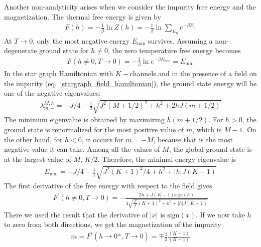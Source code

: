 \documentclass[reprint,prb,superscriptaddress]{revtex4-2}
\begin{document}
Another non-analyticity arises when we consider the impurity free energy and the magnetization. The thermal free energy is given by
\begin{equation}\begin{aligned}
	F(h) = -\frac{1}{\beta}\ln Z(h) = -\frac{1}{\beta}\ln\sum_{E_n}e^{-\beta E_n}
\end{aligned}\end{equation}
At \(T \to 0\), only the most negative energy \(E_\text{min}\) survives. Assuming a non-degenerate ground state for \(h \neq 0\), the zero temperature free energy becomes
\begin{equation}\begin{aligned}
	F(h\neq 0, T\to 0) = -\frac{1}{\beta}\ln e^{-\beta E_\text{min}} = E_\text{min}
\end{aligned}\end{equation}
In the star graph Hamiltonian with \(K-\)channels and in the presence of a field on the impurity (eq.~\ref{stargraph_field_hamiltonian}), the ground state energy will be one of the negative eigenvalues:
\begin{equation}\begin{aligned}
	\lambda^{M,h}_{m, -} = -J/4 - \frac{1}{2}\sqrt{J^2(M+1/2)^2 + h^2 + 2hJ(m+1/2)}
\end{aligned}\end{equation}
The minimum eigenvalue is obtained by maximizing \(h(m+1/2)\). For \(h>0\), the ground state is renormalized for the most positive value of \(m\), which is \(M-1\). On the other hand, for \(h<0\), it occurs for \(m=-M\), because that is the most negative value it can take. Among all the values of \(M\), the global ground state is at the largest value of \(M\), \(K/2\). Therefore, the minimal energy eigenvalue is
\begin{equation}\begin{aligned}
	E_\text{min} = -J/4 - \frac{1}{2}\sqrt{J^2(K+1)^2/4 + h^2 + |h|J(K-1)}
\end{aligned}\end{equation}
The first derivative of the free energy with respect to the field gives
\begin{equation}\begin{aligned}
	F^\prime(h\neq 0, T\to 0) =- \frac{2h + J(K-1)\text{sign}(h)}{4\sqrt{\frac{J^2}{4}(K+1)^2 + h^2 + |h|J(K-1)}}
\end{aligned}\end{equation}
There we used the result that the derivative of \(|x|\) is \(\text{sign}(x)\). If we now take \(h\) to zero from both directions, we get the magnetization of the impurity
\begin{equation}\begin{aligned}
	m = F^\prime(h \to 0^\pm, T\to 0) = \mp \frac{1}{2}\frac{(K-1)}{(K+1)}
\end{aligned}\end{equation}
\end{document}
